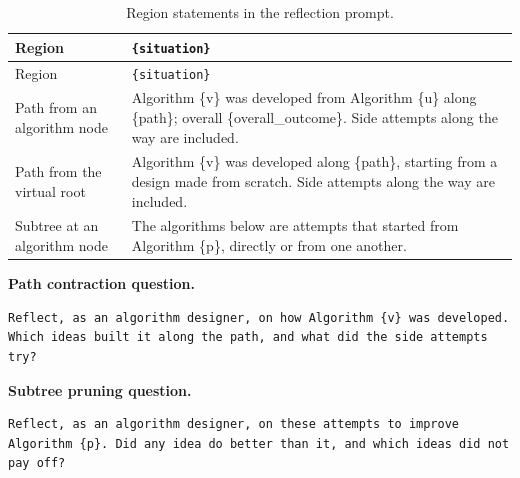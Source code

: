 \documentclass{article}
\begin{document}
\begin{longtable}[]{@{}
  >{\raggedright\arraybackslash}p{}
  >{\raggedright\arraybackslash}p{}@{}}
\caption{Region statements in the reflection prompt.}\tabularnewline
\toprule\noalign{}
\begin{minipage}[b]{\linewidth}\raggedright
Region
\end{minipage} & \begin{minipage}[b]{\linewidth}\raggedright
\texttt{\{situation\}}
\end{minipage} \\
\midrule\noalign{}
\endfirsthead
\toprule\noalign{}
\begin{minipage}[b]{\linewidth}\raggedright
Region
\end{minipage} & \begin{minipage}[b]{\linewidth}\raggedright
\texttt{\{situation\}}
\end{minipage} \\
\midrule\noalign{}
\endhead
\bottomrule\noalign{}
\endlastfoot
Path from an algorithm node & Algorithm \{v\} was developed from Algorithm \{u\} along \{path\}; overall \{overall\_outcome\}. Side attempts along the way are included. \\
Path from the virtual root & Algorithm \{v\} was developed along \{path\}, starting from a design made from scratch. Side attempts along the way are included. \\
Subtree at an algorithm node & The algorithms below are attempts that started from Algorithm \{p\}, directly or from one another. \\
\end{longtable}

\noindent\begin{minipage}{\linewidth}
\textbf{Path contraction question.}

\begin{verbatim}
Reflect, as an algorithm designer, on how Algorithm {v} was developed. Which ideas built it along the path, and what did the side attempts try?
\end{verbatim}
\end{minipage}\par

\noindent\begin{minipage}{\linewidth}
\textbf{Subtree pruning question.}

\begin{verbatim}
Reflect, as an algorithm designer, on these attempts to improve Algorithm {p}. Did any idea do better than it, and which ideas did not pay off?
\end{verbatim}
\end{minipage}\par
\end{document}
